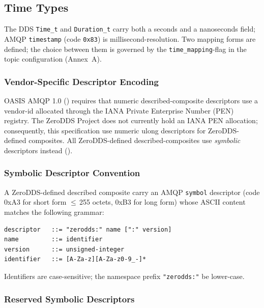 \documentclass{../styles/zerodds-vendor-spec}
\begin{document}
\subsection{Time Types}\label{sec:pim-time-types}

The DDS \texttt{Time\_t} and \texttt{Duration\_t} carry both a
seconds and a nanoseconds field; AMQP \texttt{timestamp} (code
\texttt{0x83}) is millisecond-resolution. Two mapping forms are
defined; the choice between them is governed by the
\texttt{time\_mapping}-flag in the topic configuration
(Annex~A).

\subsubsection{Vendor-Specific Descriptor Encoding}\label{sec:vendor-descriptor-encoding}

OASIS AMQP 1.0 () requires
that numeric described-composite descriptors use a vendor-id
allocated through the IANA Private Enterprise Number (PEN)
registry. The ZeroDDS Project does not currently hold an IANA
PEN allocation; consequently, this specification  use numeric ulong descriptors for ZeroDDS-defined
composites. All ZeroDDS-defined described-composites
 use \emph{symbolic} descriptors instead
().

\subsubsection{Symbolic Descriptor Convention}

A ZeroDDS-defined described composite  carry an
AMQP \texttt{symbol} descriptor (code \textsf{0xA3} for short
form $\le$\,255 octets, \textsf{0xB3} for long form) whose ASCII
content matches the following grammar:

\begin{lstlisting}
descriptor   ::= "zerodds:" name [":" version]
name         ::= identifier
version      ::= unsigned-integer
identifier   ::= [A-Za-z][A-Za-z0-9_-]*
\end{lstlisting}

Identifiers are case-sensitive; the namespace prefix
\texttt{"zerodds:"}  be lower-case.

\subsubsection{Reserved Symbolic Descriptors}
\end{document}
